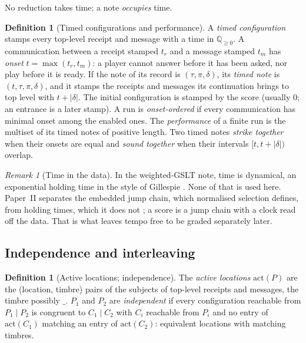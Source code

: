 \documentclass[11pt,a4paper]{article}
\theoremstyle{plain}
\theoremstyle{definition}
\newtheorem{definition}[theorem]{Definition}
\theoremstyle{remark}
\newtheorem{remark}[theorem]{Remark}
\newcommand{\len}[1]{|#1|}
\newcommand{\act}{\mathrm{act}}
\newcommand{\wild}{\_}
\begin{document}
No reduction takes time; a note \emph{occupies} time.

\begin{definition}[Timed configurations and performance]\label{def:timed}
A \emph{timed configuration} stamps every top-level receipt and message with a
time in $\mathbb{Q}_{\geq 0}$. A communication between a receipt stamped $t_r$
and a message stamped $t_m$ has \emph{onset} $t = \max(t_r, t_m)$: a player
cannot answer before it has been asked, nor play before it is ready. If the
note of its record is $(\tau,\pi,\delta)$, its \emph{timed note} is
$(t,\tau,\pi,\delta)$, and it stamps the receipts and messages its continuation brings to top level with
$t + \len{\delta}$. The initial configuration is stamped by the score (usually
$0$; an entrance is a later stamp). A run is \emph{onset-ordered} if every
communication has minimal onset among the enabled ones. The
\emph{performance} of a finite run is the multiset of its timed notes of positive
length. Two timed notes \emph{strike
together} when their onsets are equal and \emph{sound together} when their
intervals $[t, t+\len{\delta})$ overlap.
\end{definition}

\begin{remark}[Time in the data]\label{rem:time}
In the weighted-GSLT note, time is dynamical, an exponential holding time in the
style of Gillespie \cite{WeightedGSLT,Gillespie}. None of that is used here.
Paper~II separates the embedded jump chain, which normalised selection defines,
from holding times, which it does not \cite{GWpln}; a score is a jump chain
with a clock read off the data. That is what leaves tempo free to be graded
separately later.
\end{remark}

\subsection{Independence and interleaving}

\begin{definition}[Active locations; independence]\label{def:indep}
The \emph{active locations} $\act(P)$ are the (location, timbre) pairs of the
subjects of top-level receipts and messages, the timbre possibly $\wild$. $P_1$
and $P_2$ are \emph{independent} if every configuration reachable from
$P_1 \mid P_2$ is congruent to $C_1 \mid C_2$ with $C_i$ reachable from $P_i$ and
no entry of $\act(C_1)$ matching an entry of $\act(C_2)$: equivalent locations
with matching timbres.
\end{definition}
\end{document}
